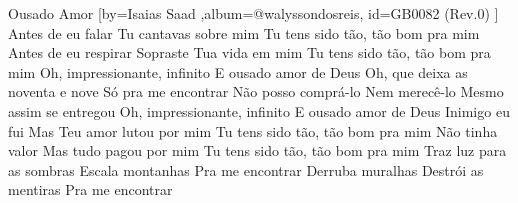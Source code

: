 \beginsong
{Ousado Amor %
}[by={Isaias Saad %
},album={@walyssondosreis},
id={GB0082 %
(Rev.0) %
}]
\beginverse*
Antes de eu falar
Tu cantavas sobre mim
Tu tens sido tão, tão bom pra mim
Antes de eu respirar
Sopraste Tua vida em mim
Tu tens sido tão, tão bom pra mim
\endverse
\beginchorus
Oh, impressionante, infinito
E ousado amor de Deus
Oh, que deixa as noventa e nove
Só pra me encontrar
Não posso comprá-lo
Nem merecê-lo
Mesmo assim se entregou
Oh, impressionante, infinito
E ousado amor de Deus
\endchorus
\beginverse*
Inimigo eu fui
Mas Teu amor lutou por mim
Tu tens sido tão, tão bom pra mim
Não tinha valor
Mas tudo pagou por mim
Tu tens sido tão, tão bom pra mim
\endverse
\beginverse*
Traz luz para as sombras
Escala montanhas
Pra me encontrar
Derruba muralhas
Destrói as mentiras
Pra me encontrar
\endverse

